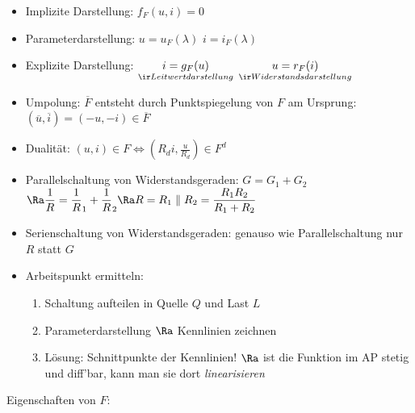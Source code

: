 \documentclass[fs, footer]{latex4ei}
\begin{document}
\begin{multicols*}{4}
{        \begin{itemize}
            \item Implizite Darstellung: $f_F (u,i) = 0$
            \item Parameterdarstellung: $u = u_F ( \lambda )$ \quad $ i = i_F (\lambda )$
            \item Explizite Darstellung: $\underset{\ir Leitwertdarstellung}{i = g_F (u)}$ \quad $\underset{\ir Widerstandsdarstellung}{u = r_F (i)}$
            \item Umpolung: $\overline F$ entsteht durch Punktspiegelung von $F$ am Ursprung: $(\overline u, \overline i) = (- u, - i) \in \overline F$
            \item Dualität: $(u,i) \in F \Leftrightarrow ( R_d i, \frac{ u}{ R_d}) \in F^d$
            \item Parallelschaltung von Widerstandsgeraden: $G = G_1 + G_2$ \\
                  $\Ra \frac 1 R = \frac 1 R_1 + \frac 1 R_2 \Ra R = R_1 \parallel R_2 = \frac{R_1 R_2}{R_1 + R_2}$
            \item Serienschaltung von Widerstandsgeraden: genauso wie Parallelschaltung nur $R$ statt $G$
            \item Arbeitspunkt ermitteln:
                  \begin{enumerate}
                      \item Schaltung aufteilen in Quelle $Q$ und Last $L$
                      \item Parameterdarstellung $\Ra$ Kennlinien zeichnen
                      \item Lösung: Schnittpunkte der Kennlinien! $\Ra$ ist die Funktion im AP stetig und diff'bar, kann man sie dort \emph{linearisieren}
                  \end{enumerate}
        \end{itemize}

        Eigenschaften von $F$:



}
\end{multicols*}
\end{document}
